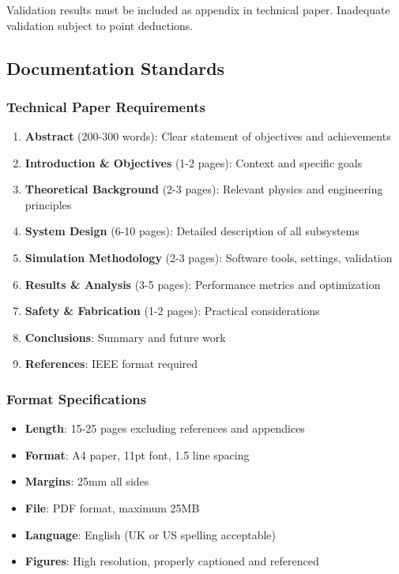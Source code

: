 \subsubsection{}
Validation results must be included as appendix in technical paper. Inadequate validation subject to point deductions.

\subsection{Documentation Standards}

\subsubsection{Technical Paper Requirements}
\begin{enumerate}[noitemsep]
    \item \textbf{Abstract} (200-300 words): Clear statement of objectives and achievements
    \item \textbf{Introduction \& Objectives} (1-2 pages): Context and specific goals
    \item \textbf{Theoretical Background} (2-3 pages): Relevant physics and engineering principles
    \item \textbf{System Design} (6-10 pages): Detailed description of all subsystems
    \item \textbf{Simulation Methodology} (2-3 pages): Software tools, settings, validation
    \item \textbf{Results \& Analysis} (3-5 pages): Performance metrics and optimization
    \item \textbf{Safety \& Fabrication} (1-2 pages): Practical considerations
    \item \textbf{Conclusions}: Summary and future work
    \item \textbf{References}: IEEE format required
\end{enumerate}

\subsubsection{Format Specifications}
\begin{itemize}[noitemsep]
    \item \textbf{Length}: 15-25 pages excluding references and appendices
    \item \textbf{Format}: A4 paper, 11pt font, 1.5 line spacing
    \item \textbf{Margins}: 25mm all sides
    \item \textbf{File}: PDF format, maximum 25MB
    \item \textbf{Language}: English (UK or US spelling acceptable)
    \item \textbf{Figures}: High resolution, properly captioned and referenced
\end{itemize}

